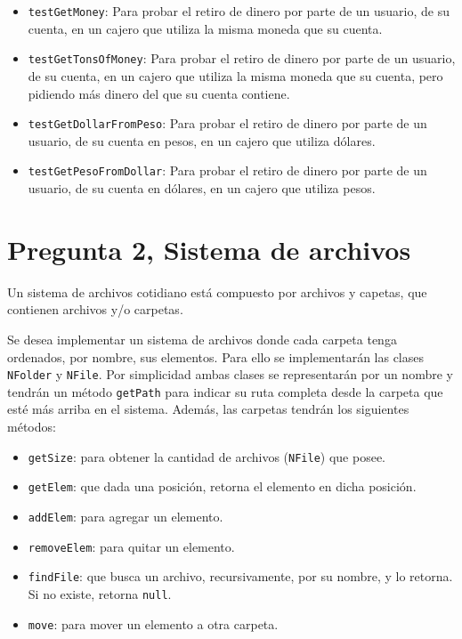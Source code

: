 \documentclass[11pt,spanish,letterpaper]{report}
\begin{document}
\begin{itemize}
	\item {\tt testGetMoney}: Para probar el retiro de dinero por parte de un usuario, de su cuenta, en un cajero que utiliza la misma moneda que su cuenta.
	\item {\tt testGetTonsOfMoney}: Para probar el retiro de dinero por parte de un usuario, de su cuenta, en un cajero que utiliza la misma moneda que su cuenta, pero pidiendo más dinero del que su cuenta contiene.
	\item {\tt testGetDollarFromPeso}: Para probar el retiro de dinero por parte de un usuario, de su cuenta en pesos, en un cajero que utiliza dólares.
	\item {\tt testGetPesoFromDollar}: Para probar el retiro de dinero por parte de un usuario, de su cuenta en dólares, en un cajero que utiliza pesos.	
\end{itemize}
\newpage

\section*{Pregunta 2, Sistema de archivos}

Un sistema de archivos cotidiano está compuesto por archivos y capetas, que contienen archivos y/o carpetas.

Se desea implementar un sistema de archivos donde cada carpeta tenga ordenados, por nombre, sus elementos. Para ello se implementarán las clases {\tt NFolder} y {\tt NFile}. Por simplicidad ambas clases se representarán por un nombre y tendrán un método {\tt getPath} para indicar su ruta completa desde la carpeta que esté más arriba en el sistema. Además, las carpetas tendrán los siguientes métodos:

\begin{itemize}
 	\item {\tt getSize}: para obtener la cantidad de archivos ({\tt NFile}) que posee.
 	\item {\tt getElem}: que dada una posición, retorna el elemento en dicha posición.
 	\item {\tt addElem}: para agregar un elemento.
 	\item {\tt removeElem}: para quitar un elemento.
 	\item {\tt findFile}: que busca un archivo, recursivamente, por su nombre, y lo retorna. Si no existe, retorna {\tt null}.
 	\item {\tt move}: para mover un elemento a otra carpeta.
\end{itemize} 
\end{document}

